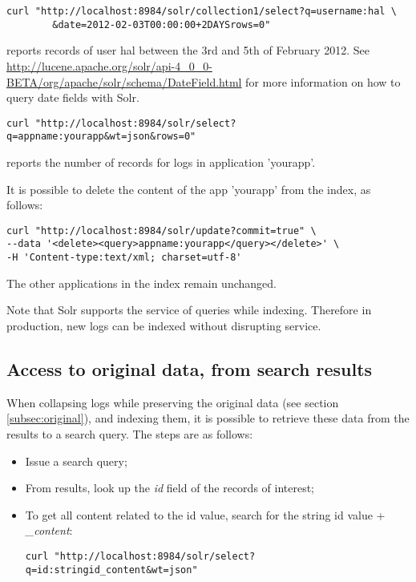 \documentclass[twoside,11pt]{article}
\begin{document}
\begin{verbatim}
curl "http://localhost:8984/solr/collection1/select?q=username:hal \
        &date=2012-02-03T00:00:00+2DAYSrows=0"
\end{verbatim}
reports records of user hal between the 3rd and 5th of February 2012. See \url{http://lucene.apache.org/solr/api-4_0_0-BETA/org/apache/solr/schema/DateField.html} for more information on how to query date fields with Solr.

\begin{verbatim}
curl "http://localhost:8984/solr/select?q=appname:yourapp&wt=json&rows=0"
\end{verbatim}
reports the number of records for logs in application 'yourapp'.

It is possible to delete the content of the app 'yourapp' from the index, as follows:

\begin{verbatim}
curl "http://localhost:8984/solr/update?commit=true" \
--data '<delete><query>appname:yourapp</query></delete>' \
-H 'Content-type:text/xml; charset=utf-8'
\end{verbatim}
The other applications in the index remain unchanged.

Note that Solr supports the service of queries while indexing. Therefore in production, new logs can be indexed without disrupting service.

\subsection{Access to original data, from search results}
When collapsing logs while preserving the original data (see section \ref{subsec:original}), and indexing them, it is possible to retrieve these data from the results to a search query. The steps are as follows:

\begin{itemize}
\item Issue a search query;
\item From results, look up the \emph{id} field of the records of interest;
\item To get all content related to the id value, search for the string id value + \emph{\_content}:

\begin{verbatim}
curl "http://localhost:8984/solr/select?q=id:stringid_content&wt=json"
\end{verbatim}
\end{itemize}
\end{document}
